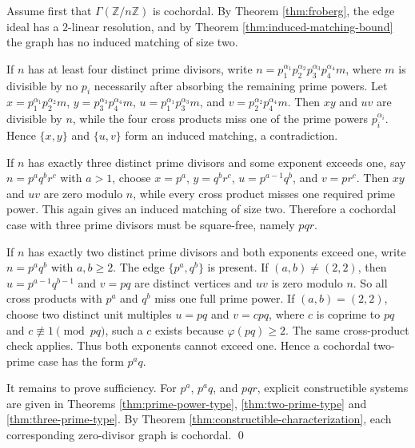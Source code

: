\documentclass[12pt]{article}
\theoremstyle{definition}
\renewenvironment{proof}{{\bf \noindent Proof.}}{\qed}
\begin{document}
\begin{proof}
Assume first that $\Gamma(\mathbb{Z}/n\mathbb{Z})$ is cochordal.  By Theorem \ref{thm:froberg}, the edge ideal has a $2$-linear resolution, and by Theorem \ref{thm:induced-matching-bound} the graph has no induced matching of size two.

\medskip

If $n$ has at least four distinct prime divisors, write $n=p_1^{\alpha_1}p_2^{\alpha_2}p_3^{\alpha_3}p_4^{\alpha_4}m$, where $m$ is divisible by no $p_i$ necessarily after absorbing the remaining prime powers. Let $x=p_1^{\alpha_1}p_2^{\alpha_2}m$, $y=p_3^{\alpha_3}p_4^{\alpha_4}m$, $u=p_1^{\alpha_1}p_3^{\alpha_3}m$, and $v=p_2^{\alpha_2}p_4^{\alpha_4}m$.  Then $xy$ and $uv$ are divisible by $n$, while the four cross products miss one of the prime powers $p_i^{\alpha_i}$.  Hence $\{x,y\}$ and $\{u,v\}$ form an induced matching, a contradiction.

\medskip

If $n$ has exactly three distinct prime divisors and some exponent exceeds one, say $n=p^a q^b r^c$ with $a>1$, choose $x=p^a$, $y=q^b r^c$, $u=p^{a-1}q^b$, and $v=pr^c$.  Then $xy$ and $uv$ are zero modulo $n$, while every cross product misses one required prime power.  This again gives an induced matching of size two.  Therefore a cochordal case with three prime divisors must be square-free, namely $pqr$.

\medskip

If $n$ has exactly two distinct prime divisors and both exponents exceed one, write $n=p^a q^b$ with $a,b\geq 2$.  The edge $\{p^a,q^b\}$ is present.  If $(a,b)\neq (2,2)$, then $u=p^{a-1}q^{b-1}$ and $v=pq$ are distinct vertices and $uv$ is zero modulo $n$. So all cross products with $p^a$ and $q^b$ miss one full prime power.  If $(a,b)=(2,2)$, choose two distinct unit multiples $u=pq$ and $v=cpq$, where $c$ is coprime to $pq$ and $c\not\equiv 1\pmod {pq}$, such a $c$ exists because $\varphi(pq)\geq 2$.  The same cross-product check applies.  Thus both exponents cannot exceed one.  Hence a cochordal two-prime case has the form $p^a q$.

\medskip

It remains to prove sufficiency.  For $p^a$, $p^a q$, and $pqr$, explicit constructible systems are given in Theorems \ref{thm:prime-power-type}, \ref{thm:two-prime-type} and \ref{thm:three-prime-type}.  By Theorem \ref{thm:constructible-characterization}, each corresponding zero-divisor graph is cochordal.
\end{proof}
\end{document}
